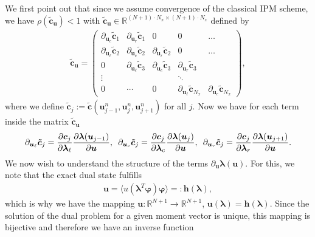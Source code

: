 \documentclass[10pt, a4paper, titlepage, bibliography=totocnumbered]{article}
\newenvironment{proof}[1][Proof]{\begin{trivlist}
\item[\hskip \labelsep {\bfseries #1}]}{\end{trivlist}}
\begin{document}
\begin{proof}
We first point out that since we assume convergence of the classical IPM scheme, we have $\rho (\bm{\tilde c}_{\bm{u}})<1$ with $\bm{\tilde c}_{\bm{u}}\in\mathbb{R}^{(N+1)\cdot N_x\times (N+1)\cdot N_x}$ defined by
\begin{align*}
\bm{\tilde c}_{\bm{u}} = 
\begin{pmatrix} 
    \partial_{\bm{u}_c}\bm{\tilde c}_{1} & \partial_{\bm{u}_r}\bm{\tilde c}_{1}& 0 & 0 & \dots \\
    \partial_{\bm{u}_{\ell}}\bm{\tilde c}_{2} & \partial_{\bm{u}_c}\bm{\tilde c}_{2} & \partial_{\bm{u}_r}\bm{\tilde c}_{2}& 0 & \dots \\
    0 & \partial_{\bm{u}_{\ell}}\bm{\tilde c}_{3} & \partial_{\bm{u}_c}\bm{\tilde c}_{3} & \partial_{\bm{u}_r}\bm{\tilde c}_{3}\\
    \vdots & & & \ddots & \\
    0 &\cdots &  0 & \partial_{\bm{u}_{\ell}}\bm{\tilde c}_{N_x} & \partial_{\bm{u}_c}\bm{\tilde c}_{N_x}
    \end{pmatrix},
\end{align*}
where we define $\bm{\tilde c}_{j}:=\bm{\tilde c}\left(\bm{u}_{j-1}^n,\bm{u}_{j}^n,\bm{u}_{j+1}^n\right)$ for all $j$. Now we have for each term inside the matrix $\bm{\tilde c}_{\bm{u}}$
\begin{align}\label{eq:cTildeDer}
\partial_{\bm{u}_{\ell}}\bm{\tilde c}_{j} = \frac{\partial \bm{c}_j}{\partial \bm{\lambda}_{\ell}}\frac{\partial \bm{\lambda}(\bm{u}_{j-1})}{\partial \bm{u}},\enskip\partial_{\bm{u}_c}\bm{\tilde c}_{j} = \frac{\partial \bm{c}_j}{\partial \bm{\lambda}_c}\frac{\partial \bm{\lambda}(\bm{u}_j)}{\partial \bm{u}},\enskip\partial_{\bm{u}_r}\bm{\tilde c}_{j} = \frac{\partial \bm{c}_j}{\partial \bm{\lambda}_r}\frac{\partial \bm{\lambda}(\bm{u}_{j+1})}{\partial \bm{u}}.
\end{align}
We now wish to understand the structure of the terms $\partial_{\bm{u}} \bm{\lambda}(\bm{u})$. For this, we note that the exact dual state fulfills
\begin{align}\label{eq:ulambda}
\bm{u} = \langle u(\bm{\lambda}^T\bm{\varphi})\bm{\varphi}\rangle =: \bm{h}(\bm{\lambda}),
\end{align}
which is why we have the mapping $\bm{u}:\mathbb{R}^{N+1}\to\mathbb{R}^{N+1}$, $\bm{u}(\bm{\lambda}) = \bm{h}(\bm{\lambda})$. Since the solution of the dual problem for a given moment vector is unique, this mapping is bijective and therefore we have an inverse function
\begin{align}\label{eq:lambdau}

\end{align}
\end{proof}
\end{document}
